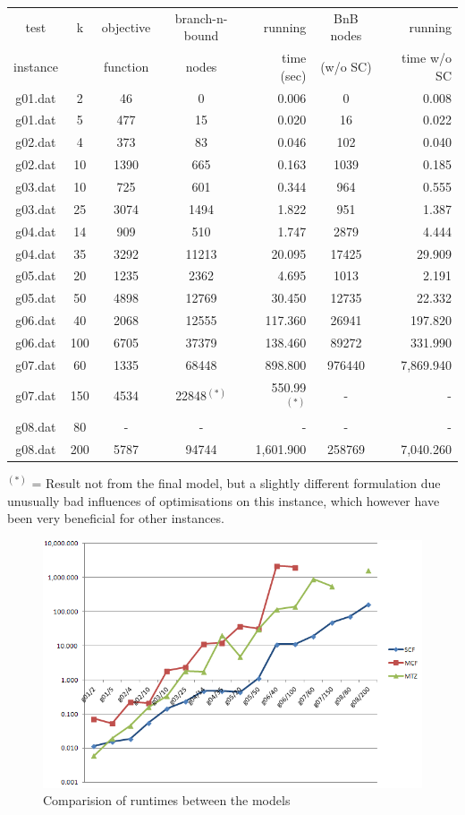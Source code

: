 \documentclass[,%
			paper=a4,%
			DIV14,
			liststotoc,
			bibtotoc,
			draft=false,%
			numbers=noendperiod
			]{scrartcl}
\begin{document}
\begin{tabular}{||c||cccr|cr||}
\hline
test     & k & objective  & branch-n-bound & running   & BnB nodes & running\\
instance &   & function   & nodes          & time (sec)& (w/o SC)  & time w/o SC \\
\hline
g01.dat	&	2	&	46	&	0	&	0.006	&	0	&	0.008	\\
g01.dat	&	5	&	477	&	15	&	0.020	&	16	&	0.022	\\
g02.dat	&	4	&	373	&	83	&	0.046	&	102	&	0.040	\\
g02.dat	&	10	&	1390	&	665	&	0.163	&	1039	&	0.185	\\
g03.dat	&	10	&	725	&	601	&	0.344	&	964	&	0.555	\\
g03.dat	&	25	&	3074	&	1494	&	1.822	&	951	&	1.387	\\
g04.dat	&	14	&	909	&	510	&	1.747	&	2879	&	4.444	\\
g04.dat	&	35	&	3292	&	11213	&	20.095	&	17425	&	29.909	\\
g05.dat	&	20	&	1235	&	2362	&	4.695	&	1013	&	2.191	\\
g05.dat	&	50	&	4898	&	12769	&	30.450	&	12735	&	22.332	\\
g06.dat	&	40	&	2068	&	12555	&	117.360	&	26941	&	197.820	\\
g06.dat	&	100	&	6705	&	37379	&	138.460	&	89272	&	331.990	\\
g07.dat	&	60	&	1335	&	68448	&	898.800	&	976440	&	7,869.940	\\
g07.dat	&	150	&	4534	&	22848$^{(*)}$	&	550.99$^{(*)}$	&	-	&	-	\\
g08.dat	&	80	&	-	&	-	&	-	&	-	&	-	\\
g08.dat	&	200	&	5787	&	94744	&	1,601.900	&	258769	&	7,040.260	\\
\hline
\end{tabular}

$^{(*)}$ = Result not from the final model, but a slightly different formulation due unusually bad influences of optimisations on this instance, which however have been very beneficial for other instances.

\begin{figure}
	\centering	\includegraphics[width=1.00\textwidth]{chart.png}
	\caption{Comparision of runtimes between the models}
	\label{fig:chart}
\end{figure}
\end{document}
